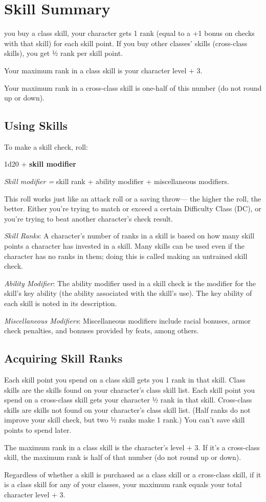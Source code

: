 \section{Skill Summary}
 you buy a class skill, your character gets 1 rank (equal to a +1 bonus on checks with that skill) for each skill point. If you buy other classes’ skills (cross-class skills), you get ½ rank per skill point.

Your maximum rank in a class skill is your character level + 3.

Your maximum rank in a cross-class skill is one-half of this number (do not round up or down).

\subsection{Using Skills}
To make a skill check, roll:

{
	\centering
 1d20 + {\bfseries skill modifier}
 
}


\textit{Skill modifier =} skill rank + ability modifier + miscellaneous modifiers.

This roll works just like an attack roll or a saving throw— the higher the roll, the better. Either you’re trying to match or exceed a certain Difficulty Class (DC), or you’re trying to beat another character’s check result.

\textit{Skill Ranks}: A character’s number of ranks in a skill is based on how many skill points a character has invested in a skill. Many skills can be used even if the character has no ranks in them; doing this is called making an untrained skill check.

\textit{Ability Modifier}: The ability modifier used in a skill check is the modifier for the skill’s key ability (the ability associated with the skill’s use). The key ability of each skill is noted in its description.

\textit{Miscellaneous Modifiers}: Miscellaneous modifiers include racial bonuses, armor check penalties, and bonuses provided by feats, among others.

\subsection{Acquiring Skill Ranks}

Each skill point you spend on a class skill gets you 1 rank in that skill. Class skills are the skills found on your character’s class skill list. Each skill point you spend on a cross-class skill gets your character ½ rank in that skill. Cross-class skills are skills not found on your character’s class skill list. (Half ranks do not improve your skill check, but two ½ ranks make 1 rank.) You can’t save skill points to spend later.

The maximum rank in a class skill is the character’s level + 3. If it’s a cross-class skill, the maximum rank is half of that number (do not round up or down).

Regardless of whether a skill is purchased as a class skill or a cross-class skill, if it is a class skill for any of your classes, your maximum rank equals your total character level + 3.